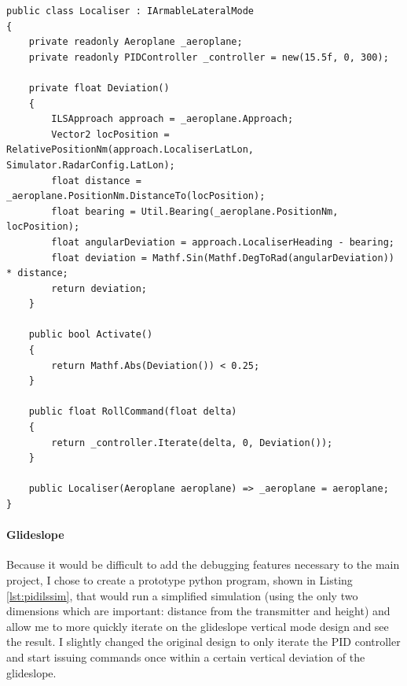 \documentclass{article}
\begin{document}
\begin{lstlisting}[caption=Localizer guidance mode class]
public class Localiser : IArmableLateralMode
{
    private readonly Aeroplane _aeroplane;
    private readonly PIDController _controller = new(15.5f, 0, 300);

    private float Deviation()
    {
        ILSApproach approach = _aeroplane.Approach;
        Vector2 locPosition = RelativePositionNm(approach.LocaliserLatLon, Simulator.RadarConfig.LatLon);
        float distance = _aeroplane.PositionNm.DistanceTo(locPosition);
        float bearing = Util.Bearing(_aeroplane.PositionNm, locPosition);
        float angularDeviation = approach.LocaliserHeading - bearing;
        float deviation = Mathf.Sin(Mathf.DegToRad(angularDeviation)) * distance;
        return deviation;
    }

    public bool Activate()
    {
        return Mathf.Abs(Deviation()) < 0.25;
    }

    public float RollCommand(float delta)
    {
        return _controller.Iterate(delta, 0, Deviation());
    }

    public Localiser(Aeroplane aeroplane) => _aeroplane = aeroplane;
}
\end{lstlisting}

\paragraph{Glideslope}
Because it would be difficult to add the debugging features necessary to the main project, I chose to create a prototype python program, shown in Listing \ref{lst:pidilssim}, that would run a simplified simulation (using the only two dimensions which are important: distance from the transmitter and height) and allow me to more quickly iterate on the glideslope vertical mode design and see the result.
I slightly changed the original design to only iterate the PID controller and start issuing commands once within a certain vertical deviation of the glideslope.
\end{document}
